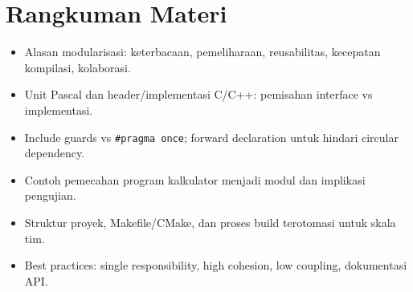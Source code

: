 \documentclass[../main.tex]{subfiles}
\begin{document}
\section{Rangkuman Materi}
\begin{itemize}
  \item Alasan modularisasi: keterbacaan, pemeliharaan, reusabilitas, kecepatan kompilasi, kolaborasi.
  \item Unit Pascal dan header/implementasi C/C++: pemisahan interface vs implementasi.
  \item Include guards vs \texttt{#pragma once}; forward declaration untuk hindari circular dependency.
  \item Contoh pemecahan program kalkulator menjadi modul dan implikasi pengujian.
  \item Struktur proyek, Makefile/CMake, dan proses build terotomasi untuk skala tim.
  \item Best practices: single responsibility, high cohesion, low coupling, dokumentasi API.
\end{itemize}
\end{document}
